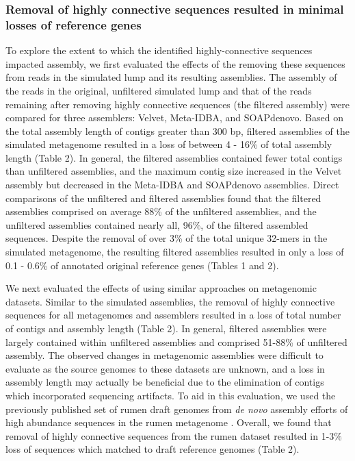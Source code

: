 \documentclass[10pt]{article}
\begin{document}
\subsubsection*{Removal of highly connective sequences resulted in minimal losses of reference genes}
To explore the extent to which the identified highly-connective sequences impacted assembly, we first evaluated the effects of the removing these sequences from reads in the simulated lump and its resulting assemblies.  The assembly of the reads in the original, unfiltered simulated lump and that of the reads remaining after removing highly connective sequences (the filtered assembly) were compared for three assemblers:  Velvet, Meta-IDBA, and SOAPdenovo.  Based on the total assembly length of contigs greater than 300 bp, filtered assemblies of the simulated metagenome resulted in a loss of between 4 - 16\% of total assembly length (Table 2).   In general, the filtered assemblies contained fewer total contigs than unfiltered assemblies, and the maximum contig size increased in the Velvet assembly but decreased in the Meta-IDBA and SOAPdenovo assemblies.  Direct comparisons of the unfiltered and filtered assemblies found that the filtered assemblies comprised on average 88\% of the unfiltered assemblies, and the unfiltered assemblies contained nearly all, 96\%, of the filtered assembled sequences.  Despite the removal of over 3\% of the total unique 32-mers in the simulated metagenome, the resulting filtered assemblies resulted in only a loss of 0.1 - 0.6\% of annotated original reference genes (Tables 1 and 2). 

We next evaluated the effects of using similar approaches on metagenomic datasets.  Similar to the simulated assemblies, the removal of highly connective sequences for all metagenomes and assemblers resulted in a loss of total number of contigs and assembly length (Table 2).  In general, filtered assemblies were largely contained within unfiltered assemblies and comprised 51-88\% of unfiltered assembly.   The observed changes in metagenomic assemblies were difficult to evaluate as the source genomes to these datasets are unknown, and a loss in assembly length may actually be beneficial due to the elimination of contigs which incorporated sequencing artifacts.  To aid in this evaluation, we used the previously published set of rumen draft genomes from \emph{de novo} assembly efforts of high abundance sequences in the rumen metagenome \cite{Hess:2011p686}.  Overall, we found that removal of highly connective sequences from the rumen dataset resulted in 1-3\% loss of sequences which matched to draft reference genomes (Table 2).  
\end{document}
